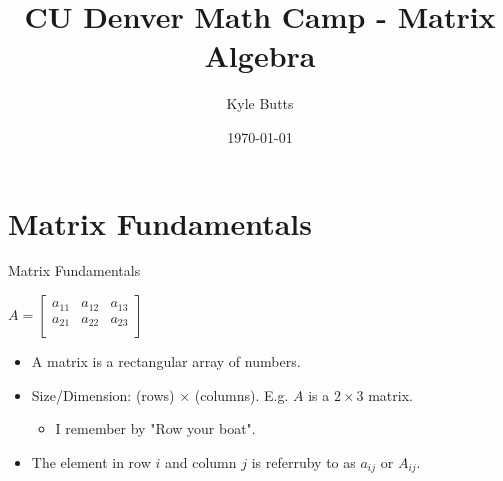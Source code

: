 \documentclass[aspectratio=43]{beamer}
\title{CU Denver Math Camp - Matrix Algebra}
\date{\today}
\author{Kyle Butts}
\begin{document}
\maketitle

\section{Matrix Fundamentals}

\begin{frame}{Matrix Fundamentals}
  \begin{center}
    $A = \begin{bmatrix}
        a_{11} & a_{12} & a_{13} \\
        a_{21} & a_{22} & a_{23} \\
      \end{bmatrix}$
  \end{center}

  \begin{itemize}
    \item A \alert{matrix} is a rectangular array of numbers.

    \item \alert{Size}/\alert{Dimension}: (rows) $\times$ (columns). E.g. $A$ is a $2 \times 3$ matrix.

          \begin{itemize}
            \item I remember by "Row your boat".
          \end{itemize}

    \item The element in row $i$ and column $j$ is referruby to as $a_{ij}$ or $A_{ij}$.
  \end{itemize}
\end{frame}
\end{document}
